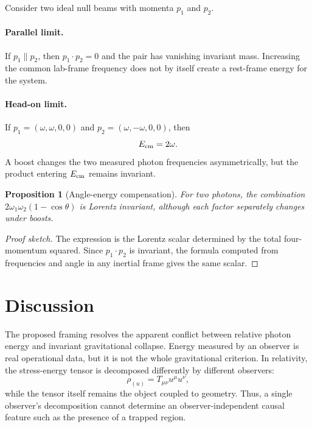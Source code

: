 \documentclass[11pt]{article}
\newtheorem{proposition}{Proposition}
\theoremstyle{remark}
\begin{document}
Consider two ideal null beams with momenta $p_1$ and $p_2$.

\paragraph{Parallel limit.}
If $p_1\parallel p_2$, then $p_1\cdot p_2=0$ and the pair has vanishing invariant mass. Increasing the common lab-frame frequency does not by itself create a rest-frame energy for the system.

\paragraph{Head-on limit.}
If $p_1=(\omega,\omega,0,0)$ and $p_2=(\omega,-\omega,0,0)$, then
\begin{equation}
E_{\rm cm}=2\omega .
\end{equation}
A boost changes the two measured photon frequencies asymmetrically, but the product entering $E_{\rm cm}$ remains invariant.

\begin{proposition}[Angle-energy compensation]
For two photons, the combination $2\omega_1\omega_2(1-\cos\theta)$ is Lorentz invariant, although each factor separately changes under boosts.
\end{proposition}

\begin{proof}[Proof sketch]
The expression is the Lorentz scalar determined by the total four-momentum squared. Since $p_1\cdot p_2$ is invariant, the formula computed from frequencies and angle in any inertial frame gives the same scalar.
\end{proof}

\section{Discussion}

The proposed framing resolves the apparent conflict between relative photon energy and invariant gravitational collapse. Energy measured by an observer is real operational data, but it is not the whole gravitational criterion. In relativity, the stress-energy tensor is decomposed differently by different observers:
\begin{equation}
\rho_{(u)}=T_{\mu\nu}u^\mu u^\nu,
\end{equation}
while the tensor itself remains the object coupled to geometry. Thus, a single observer's decomposition cannot determine an observer-independent causal feature such as the presence of a trapped region.
\end{document}
